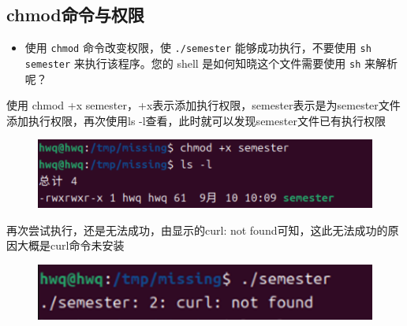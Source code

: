 \documentclass[a4paper, 12pt]{article}
\begin{document}
\subsection{chmod命令与权限}
\begin{itemize}
    \item  使用 \verb|chmod| 命令改变权限，使 \verb|./semester| 能够成功执行，不要使用 \verb|sh semester| 来执行该程序。您的 shell 是如何知晓这个文件需要使用 \verb|sh| 来解析呢？ 
\end{itemize}

使用 chmod +x semester，+x表示添加执行权限，semester表示是为semester文件添加执行权限，再次使用ls -l查看，此时就可以发现semester文件已有执行权限
\begin{figure}[H]
    \centering
    \includegraphics[width=1\linewidth]{shell6.png}
\end{figure}
再次尝试执行，还是无法成功，由显示的curl: not found可知，这此无法成功的原因大概是curl命令未安装
\begin{figure}[H]
    \centering
    \includegraphics[width=1\linewidth]{shell7.png}
\end{figure}
\end{document}
